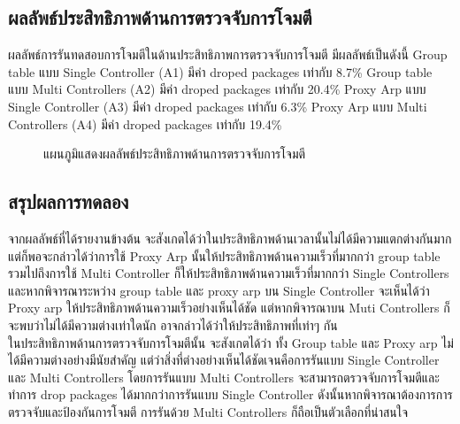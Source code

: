 \subsection{ผลลัพธ์ประสิทธิภาพด้านการตรวจจับการโจมตี}
\indent\indent
ผลลัพธ์การรันทดสอบการโจมตีในด้านประสิทธิภาพการตรวจจับการโจมตี มีผลลัพธ์เป็นดังนี้ 
Group table แบบ Single Controller (A1) มีค่า droped packages เท่ากับ 8.7\%
Group table แบบ Multi Controllers (A2) มีค่า droped packages เท่ากับ 20.4\%
Proxy Arp แบบ Single Controller (A3) มีค่า droped packages เท่ากับ 6.3\%
Proxy Arp แบบ Multi Controllers (A4) มีค่า droped packages เท่ากับ 19.4\%
\\
\begin{figure}[h!]
    \centering
    \caption{แผนภูมิแสดงผลลัพธ์ประสิทธิภาพด้านการตรวจจับการโจมตี}
\end{figure}
\subsection{สรุปผลการทดลอง}
\indent\indent
จากผลลัพธ์ที่ได้รายงานข้างต้น จะสังเกตได้ว่าในประสิทธิภาพด้านเวลานั้นไม่ได้มีความแตกต่างกันมาก แต่ก็พอจะกล่าวได้ว่าการใช้ Proxy Arp นั้นให้ประสิทธิภาพด้านความเร็วที่มากกว่า group table รวมไปถึงการใช้ Multi Controller ก็ให้ประสิทธิภาพด้านความเร็วที่มากกว่า Single Controllers 
และหากพิจารณาระหว่าง group table และ proxy arp บน Single Controller จะเห็นได้ว่า Proxy arp ให้ประสิทธิภาพด้านความเร็วอย่างเห็นได้ชัด
แต่หากพิจารณาบน Muti Controllers ก็จะพบว่าไม่ได้มีความต่างเท่าใดนัก อาจกล่าวได้ว่าให้ประสิทธิภาพที่เท่าๆ กัน
\\\indent
ในประสิทธิภาพด้านการตรวจจับการโจมตีนั้น จะสังเกตได้ว่า ทั้ง Group table และ Proxy arp ไม่ได้มีความต่างอย่างมีนัยสำคัญ แต่ว่าสิ่งที่ต่างอย่างเห็นได้ชัดเจนคือการรันแบบ Single Controller และ Multi Controllers โดยการรันแบบ Multi Controllers จะสามารถตรวจจับการโจมตีและทำการ drop packages ได้มากกว่าการรันแบบ Single Controller 
ดังนั้นหากพิจารณาต้องการการตรวจจับและป้องกันการโจมตี การรันด้วย Multi Controllers ก็ถือเป็นตัวเลือกที่น่าสนใจ
\\

